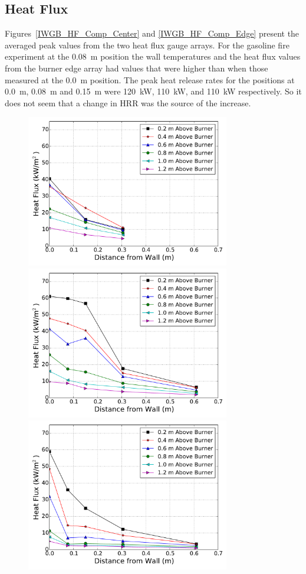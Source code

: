 \documentclass[twoside]{uocthesis}
\begin{document}
\subsection{Heat Flux}

Figures~\ref{IWGB_HF_Comp_Center} and \ref{IWGB_HF_Comp_Edge} present the averaged peak values from the two heat flux gauge arrays.  For the gasoline fire experiment at the 0.08~m position the wall temperatures and the heat flux values from the burner edge array had values that were higher than when those measured at the 0.0~m position. The peak heat release rates for the positions at 0.0~m, 0.08~m and 0.15~m were 120~kW, 110~kW, and 110~kW respectively.  So it does not seem that a change in HRR was the source of the increase.


\begin{figure}[p]
	\centering
	\includegraphics[width=3.5in]{../Figures/IWGB_NG_HF_Center_Avg}\\
	\includegraphics[width=3.5in]{../Figures/IWGB_GAS_HF_Center_Avg}\\
	\includegraphics[width=3.5in]{../Figures/IWGB_PUF_HF_Center_Avg}\\

\end{figure}
\end{document}
